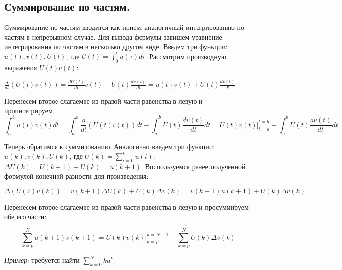 \subsection{Суммирование по частям.}
Суммирование по частям вводится как прием, аналогичный интегрированию по частям в непрерывном случае.
Для вывода формулы запишем уравнение интегрирования по частям в несколько другом виде.
Введем три функции: $\displaystyle u(t), v(t), U(t)$, где $\displaystyle U(t) = \int_{0}^{t}u(\tau)d\tau$.
Рассмотрим производную выражения $U(t)v(t)$:

$\displaystyle \frac{d}{dt}\left(U(t)v(t)\right) = \frac{dU(t)}{dt}v(t) + U(t)\frac{dv(t)}{dt} = u(t)v(t) + U(t)\frac{dv(t)}{dt}$
\vspace{5pt}

Перенесем второе слагаемое из правой части равенства в левую и проинтегрируем
\begin{equation*}
    \int_a^b u(t)v(t)dt = \int_a^b \frac{d}{dt}\left(U(t)v(t)\right)dt - \int_a^b U(t) \frac{dv(t)}{dt}dt = U(t)v(t) \biggr\rvert_{t=a}^{t=b} - \int_a^b U(t)\frac{dv(t)}{dt}dt
\end{equation*}

Теперь обратимся к суммированию. Аналогично введем три функции: $\displaystyle u(k), v(k), U(k)$, где $\displaystyle U(k) = \sum_{i=0}^k u(i)$. $\displaystyle \Delta U(k) = U(k+1) - U(k) = u(k+1)$.
Воспользуемся ранее полученной формулой конечной разности для произведения:

$\displaystyle \Delta \left(U(k)v(k)\right) = v(k+1) \Delta U(k) + U(k)\Delta v(k) = v(k+1)u(k+1) + U(k)\Delta v(k)$

Перенесем второе слагаемое из правой части равенства в левую и просуммируем обе его части:

\begin{theorem}
    \begin{equation}
        \sum_{k=p}^N u(k+1)v(k+1) = U(k)v(k) \bigg\rvert_{k=p}^{k=N+1} - \sum_{k=p}^N U(k) \Delta v(k)\label{eq:abel}
    \end{equation}
\end{theorem}

\emph{Пример:} требуется найти $\displaystyle \sum_{k=0}^N ka^k$.

